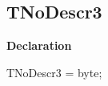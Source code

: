\documentclass{report}
\begin{document}
\subsection*{TNoDescr3}
\begin{list}{}{
\setlength{\itemindent}{0cm}
\setlength{\listparindent}{0cm}
\setlength{\leftmargin}{\evensidemargin}
\addtolength{\leftmargin}{\tmplength}
\settowidth{\labelsep}{X}
\addtolength{\leftmargin}{\labelsep}
\setlength{\labelwidth}{\tmplength}
}
\begin{flushleft}
\item[\textbf{Declaration}\hfill]
\begin{ttfamily}
TNoDescr3 = byte;\end{ttfamily}


\end{flushleft}
\end{list}
\end{document}
